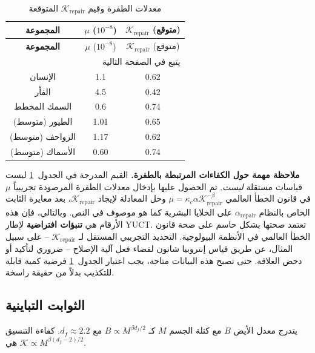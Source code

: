 \documentclass[11pt,a4paper]{article}
\newcommand{\REL}{\mathcal{K}}
\begin{document}
	\begin{longtable}{|c|c|c|}
		\caption{معدلات الطفرة وقيم \(\REL_{\mathrm{repair}}\) المتوقعة}\label{tab:mutations}\\
		\hline
		\textbf{المجموعة} & \(\mu\) (\(10^{-8}\)) & \(\REL_{\mathrm{repair}}\) (متوقع) \\
		\hline
		\endfirsthead
		\hline
		\textbf{المجموعة} & \(\mu\) (\(10^{-8}\)) & \(\REL_{\mathrm{repair}}\) (متوقع) \\
		\hline
		\endhead
		\hline
		\multicolumn{3}{r}{يتبع في الصفحة التالية}\\
		\endfoot
		\hline
		\endlastfoot
		الإنسان & 1.1 & 0.62 \\
		الفأر & 4.5 & 0.42 \\
		السمك المخطط & 0.6 & 0.74 \\
		الطيور (متوسط) & 1.01 & 0.65 \\
		الزواحف (متوسط) & 1.17 & 0.62 \\
		الأسماك (متوسط) & 0.60 & 0.74 \\
		\hline
	\end{longtable}
	
	\noindent\textbf{ملاحظة مهمة حول الكفاءات المرتبطة بالطفرة.}
	القيم المدرجة في الجدول~\ref{tab:mutations} ليست قياسات مستقلة \emph{ليست}.
	تم الحصول عليها بإدخال معدلات الطفرة المرصودة تجريبياً \(\mu\) في قانون الخطأ العالمي \(\mu = \kappa_c \alpha \REL_{\mathrm{repair}}^{-\beta}\) وحل المعادلة لإيجاد \(\REL_{\mathrm{repair}}\)، بعد معايرة الثابت الخاص بالنظام \(\alpha_{\mathrm{repair}}\) على الخلايا البشرية كما هو موصوف في النص.
	وبالتالي، فإن هذه الأرقام هي \textbf{تنبؤات افتراضية} لإطار YUCT.
	تعتمد صحتها بشكل حاسم على صحة قانون الخطأ العالمي في الأنظمة البيولوجية.
	التحديد التجريبي المستقل لـ \(\REL_{\mathrm{repair}}\) – على سبيل المثال، عن طريق قياس إنتروبيا شانون لفضاء فعل آلية الإصلاح – ضروري لتأكيد أو دحض العلاقة.
	حتى تصبح هذه البيانات متاحة، يجب اعتبار الجدول~\ref{tab:mutations} فرضية كمية قابلة للتكذيب بدلاً من حقيقة راسخة.
	
	\subsection{الثوابت التباينية}
	\label{sec:allometry}
	يتدرج معدل الأيض \(B\) مع كتلة الجسم \(M\) كـ \(B\propto M^{\beta d_f/2}\) مع \(d_f\approx2.2\). كفاءة التنسيق هي \(\REL \propto M^{\beta(d_f-2)/2}\).
	
\end{document}
